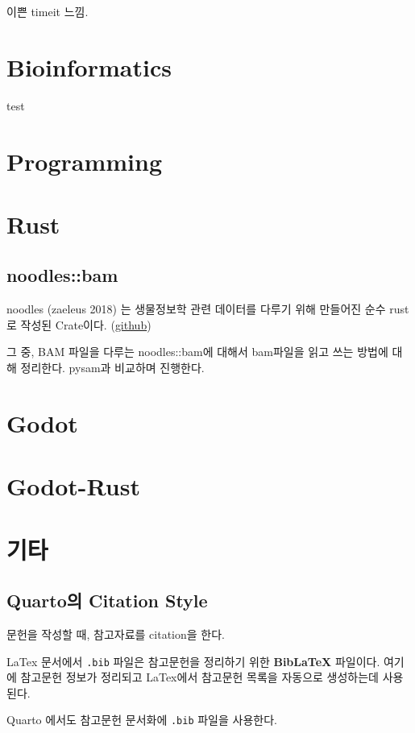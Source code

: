 \documentclass[
  letterpaper,
]{scrbook}
\begin{document}
이쁜 timeit 느낌.

\part{Bioinformatics}

test

\part{Programming}

\part{Rust}

\chapter{noodles::bam}\label{noodlesbam}

noodles (zaeleus 2018) 는 생물정보학 관련 데이터를 다루기 위해 만들어진
순수 rust로 작성된 Crate이다.
(\href{https://github.com/zaeleus/noodles}{github})

그 중, BAM 파일을 다루는 noodles::bam에 대해서 bam파일을 읽고 쓰는
방법에 대해 정리한다. pysam과 비교하며 진행한다.

\part{Godot}

\part{Godot-Rust}

\part{기타}

\chapter{Quarto의 Citation Style}\label{quartouxc758-citation-style}

문헌을 작성할 때, 참고자료를 citation을 한다.

LaTex 문서에서 \texttt{.bib} 파일은 참고문헌을 정리하기 위한
\textbf{BibLaTeX} 파일이다. 여기에 참고문헌 정보가 정리되고 LaTex에서
참고문헌 목록을 자동으로 생성하는데 사용된다.

Quarto 에서도 참고문헌 문서화에 \texttt{.bib} 파일을 사용한다.
\end{document}
